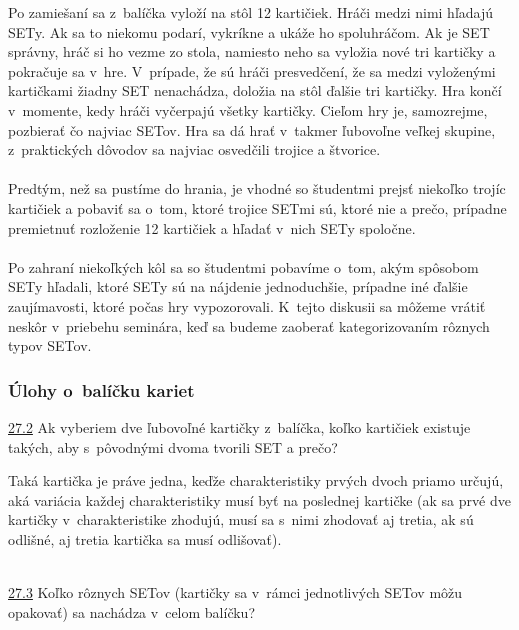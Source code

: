 Po zamiešaní sa z~balíčka vyloží na stôl 12 kartičiek. Hráči medzi nimi hľadajú SETy. Ak sa to niekomu podarí, vykríkne  a ukáže ho spoluhráčom. Ak je SET správny, hráč si ho vezme zo stola, namiesto neho sa vyložia nové tri kartičky a pokračuje sa v~hre. V~prípade, že sú hráči presvedčení, že sa medzi vyloženými kartičkami žiadny SET nenachádza, doložia na stôl ďalšie tri kartičky. Hra končí v~momente, kedy hráči vyčerpajú všetky kartičky. Cieľom hry je, samozrejme, pozbierať čo najviac SETov. Hra sa dá hrať v~takmer ľubovoľne veľkej skupine, z~praktických dôvodov sa najviac osvedčili trojice a štvorice.\\
\\
\kom Predtým, než sa pustíme do hrania, je vhodné so študentmi prejsť niekoľko trojíc kartičiek a pobaviť sa o~tom, ktoré trojice SETmi sú, ktoré nie a prečo, prípadne premietnuť rozloženie 12 kartičiek a hľadať v~nich SETy spoločne. \\
\\
Po zahraní niekoľkých kôl sa so študentmi pobavíme o~tom, akým spôsobom SETy hľadali, ktoré SETy sú na nájdenie jednoduchšie, prípadne iné ďalšie zaujímavosti, ktoré počas hry vypozorovali. K~tejto diskusii sa môžeme vrátiť neskôr v~priebehu seminára, keď sa budeme zaoberať kategorizovaním rôznych typov SETov.

\subsubsection*{Úlohy o~balíčku kariet}
\begin{tcolorbox}[breakable,notitle,boxrule=0pt,colback=light-gray,colframe=light-gray]\ul{27.2} Ak vyberiem dve ľubovoľné kartičky z~balíčka, koľko kartičiek existuje takých, aby s~pôvodnými dvoma tvorili SET a prečo? \end{tcolorbox}

\rie Taká kartička je práve jedna, keďže charakteristiky prvých dvoch priamo určujú, aká variácia každej charakteristiky musí byť na poslednej kartičke (ak sa prvé dve kartičky v~charakteristike zhodujú, musí sa s~nimi zhodovať aj tretia, ak sú odlišné, aj tretia kartička sa musí odlišovať).\\
\\
\begin{tcolorbox}[breakable,notitle,boxrule=0pt,colback=light-gray,colframe=light-gray]\ul{27.3} Koľko rôznych SETov (kartičky sa v~rámci jednotlivých SETov môžu opakovať) sa nachádza v~celom balíčku?\end{tcolorbox}

